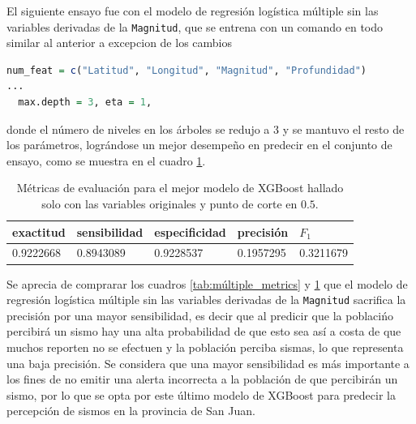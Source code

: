 \documentclass[a4paper]{report}
\begin{document}
El siguiente ensayo fue con el modelo de regresión logística múltiple sin las variables derivadas de la \verb'Magnitud', que se entrena con un comando en todo similar al anterior a excepcion de los cambios
\begin{lstlisting}[language=R, breaklines=true]
num_feat = c("Latitud", "Longitud", "Magnitud", "Profundidad")
... 
  max.depth = 3, eta = 1, 
\end{lstlisting}
donde el número de niveles en los árboles se redujo a 3 y se mantuvo el resto de los parámetros, lográndose un mejor desempeño en predecir en el conjunto de ensayo, como se muestra en el cuadro \ref{tab:xgboost_metrics_sin_derivadas}.

\begin{table}[!ht]
	\centering
	\begin{tabular}{lllll}
	\toprule
	exactitud & sensibilidad & especificidad & precisión & \(F_1\) \\
	\midrule
	\num{0.9222668} & \num{0.8943089} & \num{0.9228537} & \num{0.1957295} & \num{0.3211679} \\
	\bottomrule
	\end{tabular}
	\caption{Métricas de evaluación para el mejor modelo de XGBoost hallado solo con las variables originales y punto de corte en \(0.5\).}
	\label{tab:xgboost_metrics_sin_derivadas}
\end{table}

Se aprecia de comprarar los cuadros \ref{tab:múltiple_metrics} y \ref{tab:xgboost_metrics_sin_derivadas} que el modelo de regresión logística múltiple sin las variables derivadas de la \verb'Magnitud' sacrifica la precisión por una mayor sensibilidad, es decir que al predicir que la poblacińo percibirá un sismo hay una alta probabilidad de que esto sea así a costa de que muchos reporten no se efectuen y la población perciba sismas, lo que representa una baja precisión.
Se considera que una mayor sensibilidad es más importante a los fines de no emitir una alerta incorrecta a la población de que percibirán un sismo, por lo que se opta por este último modelo de XGBoost para predecir la percepción de sismos en la provincia de San Juan. 



\end{document}
